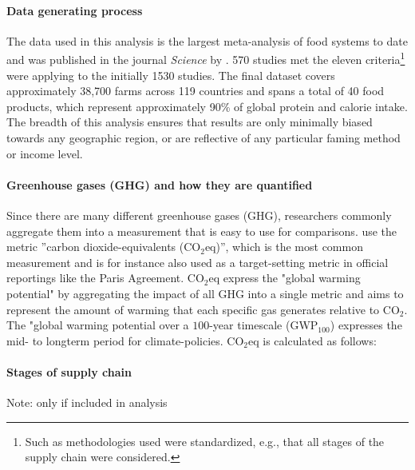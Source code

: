 \documentclass{article}
\begin{document}
\paragraph{Data generating process} \label{dataGen}
The data used in this analysis  is the largest meta-analysis of food systems to date and was published in the journal \textit{Science} by \citet{Poore2018}.
570 studies met the eleven criteria\footnote{Such as  methodologies used were standardized, e.g., that all stages of the supply chain were considered.} \citet{Poore2018}  were applying to the initially  1530 studies.
The final dataset covers approximately 38,700 farms across 119 countries and spans a total of 40 food products, which represent approximately 90\% of global protein and calorie intake. The breadth of this analysis ensures that results are only minimally biased towards any geographic region, or are reflective of any particular faming method or income level.
\paragraph*{Greenhouse gases (GHG) and how they are quantified}
Since there are many different greenhouse gases (GHG), researchers commonly aggregate them into a measurement that is easy to use for comparisons. 
\citet{Poore2018} use the metric 
''carbon dioxide-equivalents (CO$_{2}$eq)'', which is the most common measurement and is for instance  also used as a target-setting metric in official reportings like the Paris Agreement. CO$_{2}$eq express the "global warming potential" by aggregating the impact of all GHG into a single metric  and  aims to represent the amount of warming that each specific gas generates relative to CO$_2$. The "global warming potential over a $100$-year timescale (GWP$_{100}$) expresses the mid- to longterm period for climate-policies. CO$_{2}$eq is calculated as follows: 
\paragraph{Stages of supply chain}
Note: only if included in analysis
\end{document}
